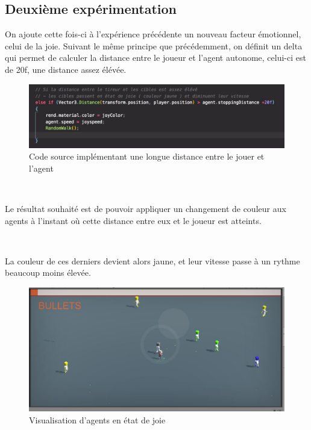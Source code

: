 \subsection{Deuxième expérimentation}

On ajoute cette fois-ci à l'expérience précédente un nouveau facteur émotionnel, celui de la joie.
Suivant le même principe que précédemment, on définit un delta qui permet de calculer la distance entre le joueur et l’agent autonome, celui-ci est de 20f, une distance assez élévée. 

\begin{figure}[th]
\centering
\includegraphics{Figures/fonct2.JPG}
\decoRule
\caption[Code source implémentant une longue distance]{Code source implémentant une longue distance entre le jouer et l'agent}
\label{fig:bichi}
\end{figure}



~\par
Le résultat souhaité est de pouvoir appliquer un changement de couleur aux agents à l’instant où cette distance entre eux et le joueur est atteints.

~\par
La couleur de ces derniers devient alors jaune, et leur vitesse passe à un rythme beaucoup moins élevée.

\begin{figure}[th]
\centering
\includegraphics{Figures/bichi2.JPG}
\decoRule
\caption[Visualisation d'agents en état de joie]{Visualisation d'agents en état de joie}
\label{fig:bichi}
\end{figure}


